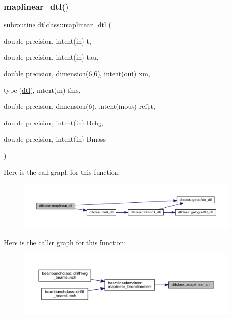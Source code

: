 \subsubsection{\texorpdfstring{maplinear\_dtl()}{maplinear\_dtl()}}
{\footnotesize\ttfamily subroutine dtlclass\+::maplinear\+\_\+dtl (\begin{DoxyParamCaption}\item[{double precision, intent(in)}]{t,  }\item[{double precision, intent(in)}]{tau,  }\item[{double precision, dimension(6,6), intent(out)}]{xm,  }\item[{type (\mbox{\hyperlink{namespacedtlclass_structdtlclass_1_1dtl}{dtl}}), intent(in)}]{this,  }\item[{double precision, dimension(6), intent(inout)}]{refpt,  }\item[{double precision, intent(in)}]{Bchg,  }\item[{double precision, intent(in)}]{Bmass }\end{DoxyParamCaption})}

Here is the call graph for this function\+:\nopagebreak
\begin{figure}[H]
\begin{center}
\leavevmode
\includegraphics[width=350pt]{namespacedtlclass_afcf262e9f63f2008931d898ff6d9973a_cgraph}
\end{center}
\end{figure}
Here is the caller graph for this function\+:\nopagebreak
\begin{figure}[H]
\begin{center}
\leavevmode
\includegraphics[width=350pt]{namespacedtlclass_afcf262e9f63f2008931d898ff6d9973a_icgraph}
\end{center}
\end{figure}
\mbox{\label{namespacedtlclass_aa1988f1526102adea7683c31ce2164d9}} 
